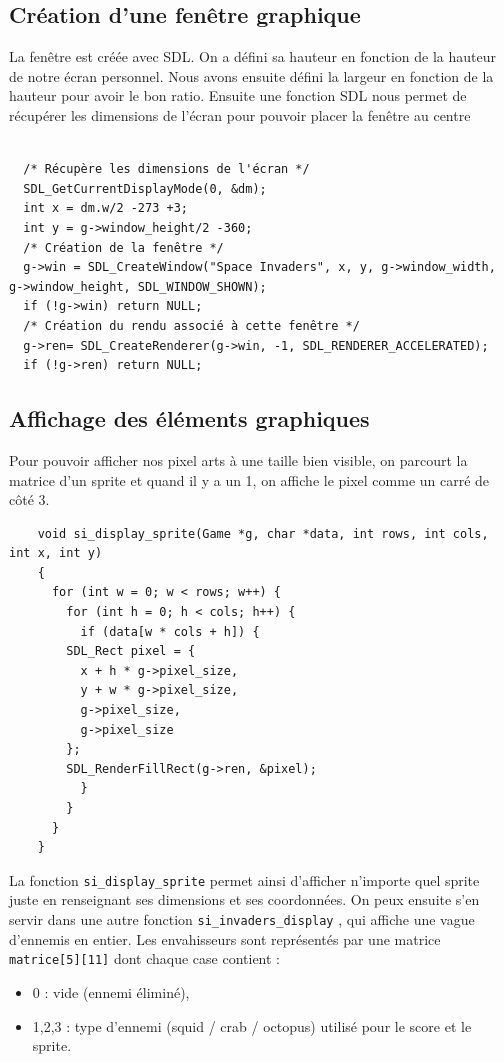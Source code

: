 \documentclass[12pt,a4paper]{report}
\begin{document}
\subsection{Création d'une fenêtre graphique}
   La fenêtre est créée avec SDL. On a défini sa hauteur en fonction de la hauteur de notre écran personnel. Nous avons ensuite défini la largeur en fonction de la hauteur pour avoir le bon ratio. Ensuite une fonction SDL nous permet de récupérer les dimensions de l'écran pour pouvoir placer la fenêtre au centre 
\begin{lstlisting}

  /* Récupère les dimensions de l'écran */
  SDL_GetCurrentDisplayMode(0, &dm);
  int x = dm.w/2 -273 +3; 
  int y = g->window_height/2 -360; 
  /* Création de la fenêtre */
  g->win = SDL_CreateWindow("Space Invaders", x, y, g->window_width, g->window_height, SDL_WINDOW_SHOWN);
  if (!g->win) return NULL; 
  /* Création du rendu associé à cette fenêtre */
  g->ren= SDL_CreateRenderer(g->win, -1, SDL_RENDERER_ACCELERATED);
  if (!g->ren) return NULL;

\end{lstlisting}

\subsection{Affichage des éléments graphiques}
    Pour pouvoir afficher nos pixel arts à une taille bien visible, on parcourt la matrice d'un sprite et quand il y a un 1, on affiche le pixel comme un carré de côté 3.

\begin{lstlisting}
    void si_display_sprite(Game *g, char *data, int rows, int cols, int x, int y)
    {
      for (int w = 0; w < rows; w++) {
        for (int h = 0; h < cols; h++) {
          if (data[w * cols + h]) {
    	SDL_Rect pixel = {
    	  x + h * g->pixel_size,
    	  y + w * g->pixel_size,
    	  g->pixel_size,
    	  g->pixel_size
    	};
    	SDL_RenderFillRect(g->ren, &pixel);
          }
        }
      }
    }
\end{lstlisting}
    La fonction \texttt{si\_display\_sprite} permet ainsi d'afficher n'importe quel sprite juste en renseignant ses dimensions et ses coordonnées.
    On peux ensuite s'en servir dans une autre fonction \texttt{si\_invaders\_display} , qui affiche une vague d'ennemis en entier. 
    Les envahisseurs sont représentés par une matrice
\texttt{matrice[5][11]} dont chaque case contient :
\begin{itemize}
  \item 0 : vide (ennemi éliminé),
  \item 1,2,3 : type d'ennemi (squid / crab / octopus) utilisé pour le score et le sprite.
\end{itemize}
\end{document}
